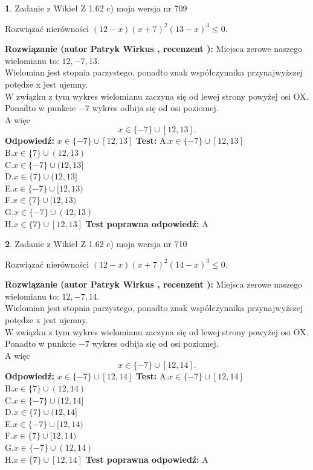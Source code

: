 \documentclass[12pt, a4paper]{article}
\theoremstyle{definition} %
\newtheorem{zad}{}
\newcommand{\zadStart}[1]{\begin{zad}#1\newline}
\newcommand{\zadStop}{\end{zad}}
\newcommand{\rozwStart}[2]{\noindent \textbf{Rozwiązanie (autor #1 , recenzent #2): }\newline}
\newcommand{\rozwStop}{\newline}
\newcommand{\odpStart}{\noindent \textbf{Odpowiedź:}\newline}
\newcommand{\odpStop}{\newline}
\newcommand{\testStart}{\noindent \textbf{Test:}\newline}
\newcommand{\testStop}{\newline}
\newcommand{\kluczStart}{\noindent \textbf{Test poprawna odpowiedź:}\newline}
\newcommand{\kluczStop}{\newline}
\begin{document}
\zadStart{Zadanie z Wikieł Z 1.62 c) moja wersja nr 709}

Rozwiązać nierówności $(12-x)(x+7)^{2}(13-x)^{3}\le0$.
\zadStop
\rozwStart{Patryk Wirkus}{}
Miejsca zerowe naszego wielomianu to: $12, -7, 13$.\\
Wielomian jest stopnia parzystego, ponadto znak współczynnika przy\linebreak najwyższej potędze x jest ujemny.\\ W związku z tym wykres wielomianu zaczyna się od lewej strony powyżej osi OX.\\
Ponadto w punkcie $-7$ wykres odbija się od osi poziomej.\\
A więc $$x \in \{-7\} \cup [12,13].$$
\rozwStop
\odpStart
$x \in \{-7\} \cup [12,13]$
\odpStop
\testStart
A.$x \in \{-7\} \cup [12,13]$\\
B.$x \in \{7\} \cup (12,13)$\\
C.$x \in \{-7\} \cup (12,13]$\\
D.$x \in \{7\} \cup (12,13]$\\
E.$x \in \{-7\} \cup [12,13)$\\
F.$x \in \{7\} \cup [12,13)$\\
G.$x \in \{-7\} \cup (12,13)$\\
H.$x \in \{7\} \cup [12,13]$
\testStop
\kluczStart
A
\kluczStop



\zadStart{Zadanie z Wikieł Z 1.62 c) moja wersja nr 710}

Rozwiązać nierówności $(12-x)(x+7)^{2}(14-x)^{3}\le0$.
\zadStop
\rozwStart{Patryk Wirkus}{}
Miejsca zerowe naszego wielomianu to: $12, -7, 14$.\\
Wielomian jest stopnia parzystego, ponadto znak współczynnika przy\linebreak najwyższej potędze x jest ujemny.\\ W związku z tym wykres wielomianu zaczyna się od lewej strony powyżej osi OX.\\
Ponadto w punkcie $-7$ wykres odbija się od osi poziomej.\\
A więc $$x \in \{-7\} \cup [12,14].$$
\rozwStop
\odpStart
$x \in \{-7\} \cup [12,14]$
\odpStop
\testStart
A.$x \in \{-7\} \cup [12,14]$\\
B.$x \in \{7\} \cup (12,14)$\\
C.$x \in \{-7\} \cup (12,14]$\\
D.$x \in \{7\} \cup (12,14]$\\
E.$x \in \{-7\} \cup [12,14)$\\
F.$x \in \{7\} \cup [12,14)$\\
G.$x \in \{-7\} \cup (12,14)$\\
H.$x \in \{7\} \cup [12,14]$
\testStop
\kluczStart
A
\kluczStop
\end{document}
